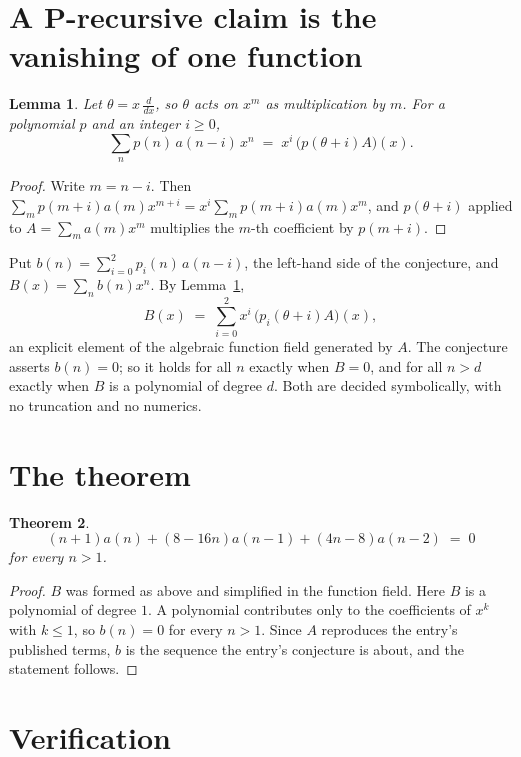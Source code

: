 \documentclass[11pt,a4paper]{article}
\theoremstyle{plain}
\newtheorem{theorem}{Theorem}
\newtheorem{lemma}[theorem]{Lemma}
\theoremstyle{definition}
\begin{document}
\section{A P-recursive claim is the vanishing of one function}

\begin{lemma}\label{lem:theta}
Let $\theta=x\,\frac{d}{dx}$, so $\theta$ acts on $x^m$ as multiplication by $m$. For a
polynomial $p$ and an integer $i\ge0$,
\[
\sum_{n} p(n)\,a(n-i)\,x^{n}\;=\;x^{i}\,\bigl(p(\theta+i)A\bigr)(x).
\]
\end{lemma}

\begin{proof}
Write $m=n-i$. Then $\sum_m p(m+i)a(m)x^{m+i}=x^i\sum_m p(m+i)a(m)x^m$, and $p(\theta+i)$
applied to $A=\sum_m a(m)x^m$ multiplies the $m$-th coefficient by $p(m+i)$.
\end{proof}

Put $b(n)=\sum_{i=0}^{2}p_i(n)\,a(n-i)$, the left-hand side of the conjecture, and
$B(x)=\sum_n b(n)x^n$. By Lemma~\ref{lem:theta},
\[
B(x)\;=\;\sum_{i=0}^{2}x^{i}\,\bigl(p_i(\theta+i)A\bigr)(x),
\]
an explicit element of the algebraic function field generated by $A$. The conjecture asserts
$b(n)=0$; so it holds for all $n$ exactly when $B=0$, and for all $n>d$ exactly when $B$ is a
polynomial of degree $d$. Both are decided symbolically, with no truncation and no numerics.

\section{The theorem}

\begin{theorem}
\[
\left(n + 1\right)a(n) + \left(8 - 16 n\right)a(n-1) + \left(4 n - 8\right)a(n-2)\;=\;0
\]
for every $n>1$.
\end{theorem}

\begin{proof}
$B$ was formed as above and simplified in the function field. Here $B$ is a polynomial of degree $1$. A polynomial contributes only to the coefficients of $x^k$ with $k\le1$, so $b(n)=0$ for every $n>1$. Since $A$ reproduces the
entry's published terms, $b$ is the sequence the entry's conjecture is about, and the statement
follows.
\end{proof}

\section{Verification}
\end{document}
